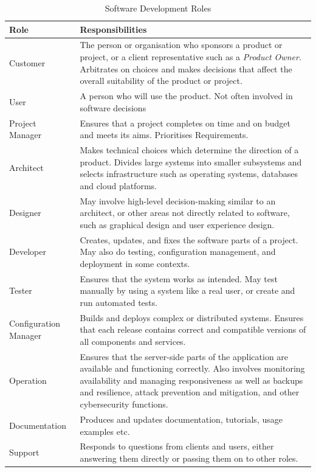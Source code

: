 \begin{table}[htbp]
\begin{tabular}{p{2.5cm} | p{10cm}}
\textbf{Role} & \textbf{Responsibilities} \\
\hline
Customer & The person or organisation who sponsors a product or project, or a client representative such as a \emph{Product Owner}. Arbitrates on choices and makes decisions that affect the overall suitability of the product or project. \\
\hline
User & A person who will use the product. Not often involved in software decisions \\
\hline
Project Manager & Ensures that a project completes on time and on budget and meets its aims. Prioritises Requirements. \\
\hline
Architect & Makes technical choices which determine the direction of a product. Divides large systems into smaller subsystems and selects infrastructure such as operating systems, databases and cloud platforms. \\
\hline
Designer & May involve high-level decision-making similar to an architect, or other areas not directly related to software, such as graphical design and user experience design. \\
\hline
Developer & Creates, updates, and fixes the software parts of a project. May also do testing, configuration management, and deployment in some contexts. \\
\hline
Tester & Ensures that the system works as intended. May test manually by using a system like a real user, or create and run automated tests. \\
\hline
Configuration Manager & Builds and deploys complex or distributed systems. Ensures that each release contains correct and compatible versions of all components and services. \\
\hline
Operation & Ensures that the server-side parts of the application are available and functioning correctly. Also involves monitoring availability and managing responsiveness as well as backups and resilience, attack prevention and mitigation, and other cybersecurity functions. \\
\hline
Documentation & Produces and updates documentation, tutorials, usage examples etc. \\
\hline
Support & Responds to questions from clients and users, either answering them directly or passing them on to other roles. \\
\hline
\end{tabular}
\caption{Software Development Roles\label{table:roles}}
\end{table}

